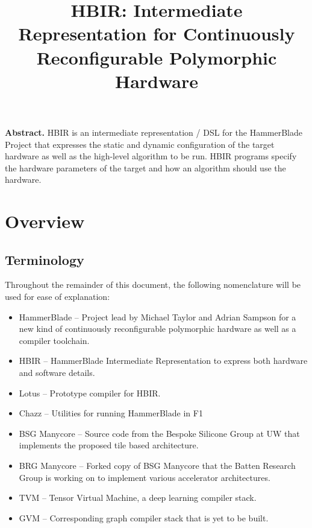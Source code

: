 \documentclass{article}
\title{HBIR: Intermediate Representation for Continuously Reconfigurable Polymorphic Hardware}
\let\ACMmaketitle=\maketitle
\renewcommand{\maketitle}{\begingroup\let\footnote=\thanks\ACMmaketitle\endgroup}
\begin{document}
\maketitle

\onehalfspacing

\textbf{Abstract.} HBIR is an intermediate representation / DSL for the HammerBlade Project that expresses the static and dynamic configuration of the target hardware as well as the high-level algorithm to be run. HBIR programs specify the hardware parameters of the target and how an algorithm should use the hardware. 

\tableofcontents
\newpage

\section{Overview}
\subsection{Terminology}\label{sec:terms}
Throughout the remainder of this document, the following nomenclature will be used for ease of explanation:

\begin{itemize}
    \item HammerBlade -- Project lead by Michael Taylor and Adrian Sampson for a new kind of continuously reconfigurable polymorphic hardware as well as a compiler toolchain.
    \item HBIR -- HammerBlade Intermediate Representation to express both hardware and software details.
    \item Lotus -- Prototype compiler for HBIR.
    \item Chazz -- Utilities for running HammerBlade in F1
    \item BSG Manycore -- Source code from the Bespoke Silicone Group at UW that implements the proposed tile based architecture. 
    \item BRG Manycore -- Forked copy of BSG Manycore that the Batten Research Group is working on to implement various accelerator architectures. 
    \item TVM -- Tensor Virtual Machine, a deep learning compiler stack.
    \item GVM -- Corresponding graph compiler stack that is yet to be built.
\end{itemize}
\end{document}
